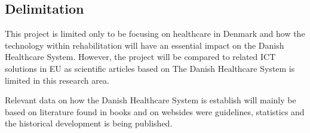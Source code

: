 \subsection{Delimitation}
This project is limited only to be focusing on healthcare in Denmark and how the technology within rehabilitation will have an essential impact on the Danish Healthcare System. However, the project will be compared to related ICT solutions in EU as scientific articles based on The Danish Healthcare System is limited in this research area. 

Relevant data on how the Danish Healthcare System is establish will mainly be based on literature found in books and on websides were guidelines, statistics and the historical development is being published. 


